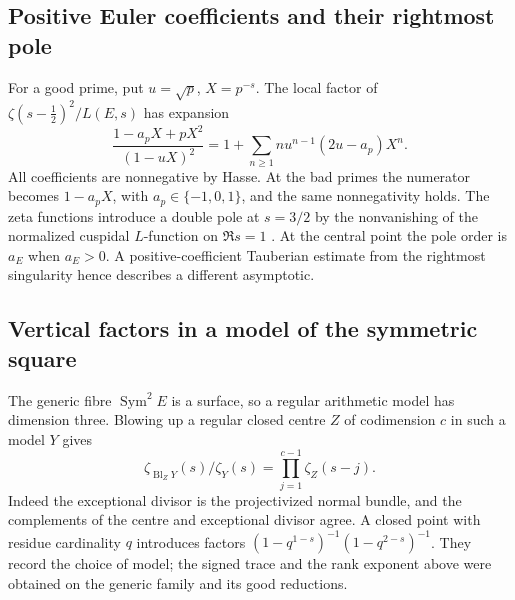 \documentclass[11pt]{article}
\begin{document}
\subsection{Positive Euler coefficients and their rightmost pole}
For a good prime, put $u=\sqrt p$, $X=p^{-s}$. The local factor of
$\zeta(s-\tfrac12)^2/L(E,s)$ has expansion
\[
 \frac{1-a_pX+pX^2}{(1-uX)^2}
 =1+\sum_{n\ge1}n u^{n-1}(2u-a_p)X^n .
\]
All coefficients are nonnegative by Hasse. At the bad primes the
numerator becomes $1-a_pX$, with $a_p\in\{-1,0,1\}$, and the same
nonnegativity holds. The zeta functions introduce a double pole at
$s=3/2$ by the nonvanishing of the normalized cuspidal $L$-function
on $\Re s=1$ \cite{JS}. At the central point the pole order is $a_E$
when $a_E>0$. A positive-coefficient Tauberian estimate from the
rightmost singularity hence describes a different asymptotic.

\subsection{Vertical factors in a model of the symmetric square}
The generic fibre $\operatorname{Sym}^2E$ is a surface, so a regular
arithmetic model has dimension three. Blowing up a regular closed
centre $Z$ of codimension $c$ in such a model $Y$ gives
\[
 \zeta_{\operatorname{Bl}_Z Y}(s)/\zeta_Y(s)
 =\prod_{j=1}^{c-1}\zeta_Z(s-j).
\]
Indeed the exceptional divisor is the projectivized normal bundle,
and the complements of the centre and exceptional divisor agree.
A closed point with residue cardinality $q$ introduces factors
$(1-q^{1-s})^{-1}(1-q^{2-s})^{-1}$. They record the choice of model;
the signed trace and the rank exponent above were obtained on the
generic family and its good reductions.
\end{document}
